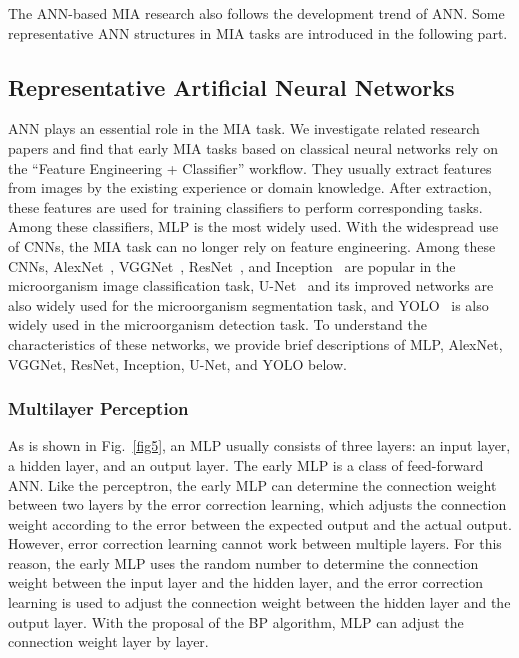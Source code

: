 The ANN-based MIA research also follows the development trend of ANN. Some representative ANN structures in MIA tasks are introduced in the following part.


\subsection{Representative Artificial Neural Networks}
\label{RANN}

ANN plays an essential role in the MIA task. We investigate related research papers and find that early MIA tasks based on classical neural networks rely on the ``Feature Engineering + Classifier'' workflow. They usually extract features from images by the existing experience or domain knowledge. After extraction, these features are used for training classifiers to perform corresponding tasks. Among these classifiers, MLP is the most widely used. With the widespread use of CNNs, the MIA task can no longer rely on feature engineering. Among these CNNs, AlexNet~\cite{Krizhevsky-2017-ICDC}, VGGNet~\cite{Simonyan-2014-VDCN}, ResNet~\cite{He-2016-DRLI}, and Inception~\cite{Szegedy-2015-GDC} are popular in the microorganism image classification task, U-Net~\cite{Ronneberger-2015-UCNB} and its improved networks are also widely used for the microorganism segmentation task, and YOLO~\cite{Redmon-2016-YOLO} is also widely used in the microorganism detection task. To understand the characteristics of these networks, we provide brief descriptions of MLP, AlexNet, VGGNet, ResNet, Inception, U-Net, and YOLO below.

\subsubsection{Multilayer Perception}
\label{MLP}

As is shown in Fig.~\ref{fig5}, an MLP usually consists of three layers: an input layer, a hidden layer, and an output layer. The early MLP is a class of feed-forward ANN. Like the perceptron, the early MLP can determine the connection weight between two layers by the error correction learning, which adjusts the connection weight according to the error between the expected output and the actual output. However, error correction learning cannot work between multiple layers. For this reason, the early MLP uses the random number to determine the connection weight between the input layer and the hidden layer, and the error correction learning is used to adjust the connection weight between the hidden layer and the output layer. With the proposal of the BP algorithm, MLP can adjust the connection weight layer by layer.

